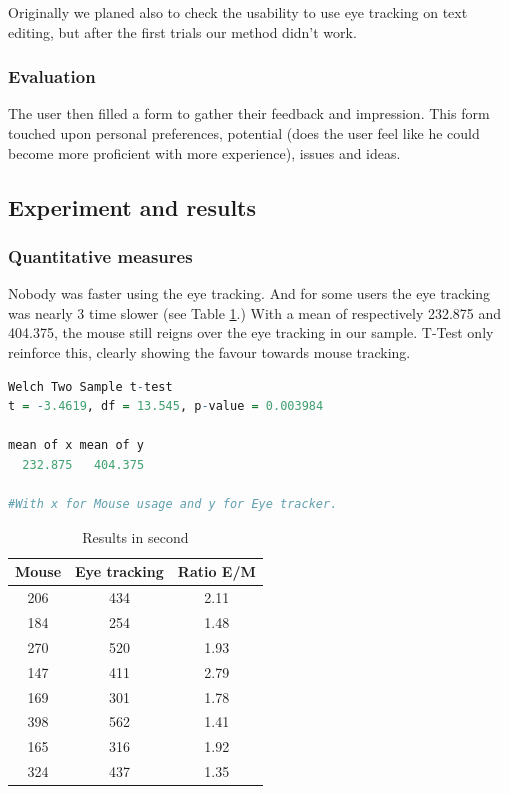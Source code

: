 \documentclass[12pt, a4paper]{article}
\begin{document}
Originally we planed also to check the usability to use eye tracking on text editing, but after the first trials our method didn't work.


\subsubsection{Evaluation}
The user then filled a form to gather their feedback and impression. This form touched upon personal preferences, potential (does the user feel like he could become more proficient with more experience), issues and ideas. 

\subsection{Experiment and results}

\subsubsection{Quantitative measures}
Nobody was faster using the eye tracking. And for some users the eye tracking was nearly 3 time slower (see Table \ref{timetable}.) With a mean of respectively 232.875 and 404.375, the mouse still reigns over the eye tracking in our sample. T-Test only reinforce this, clearly showing the favour towards mouse tracking. 

\begin{lstlisting}[frame=single, language=R]
Welch Two Sample t-test
t = -3.4619, df = 13.545, p-value = 0.003984

mean of x mean of y 
  232.875   404.375 

#With x for Mouse usage and y for Eye tracker.
\end{lstlisting}

\begin{table}
\centering
\begin{tabular}{c|c|c}
Mouse & Eye tracking&Ratio E/M\\
\hline
206&434&2.11\\
184&254&1.48\\
270&520&1.93\\
147&411&2.79\\
169&301&1.78\\
398&562&1.41\\
165&316&1.92\\
324&437&1.35\\
\end{tabular}
\caption{Results in second}
\label{timetable}
\end{table}
\end{document}
